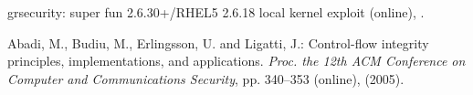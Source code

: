 \documentclass[english,preprint,JIP]{ipsj}
\begin{document}
\begin{thebibliography}{99}
  grsecurity: super fun 2.6.30+/RHEL5 2.6.18 local kernel exploit (online),  .%
 

  Abadi, M., Budiu, M., Erlingsson, U. and Ligatti, J.: Control-flow integrity principles, implementations, and applications. \textit{Proc. the 12th ACM Conference on Computer and Communications Security}, pp. 340--353 (online),  (2005).
 


\end{thebibliography}
\end{document}
